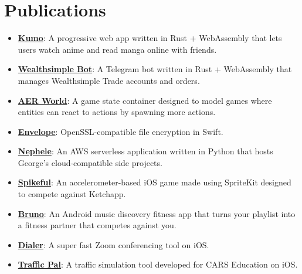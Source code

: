 \documentclass{article}
\newcommand{\resumeItem}[2]{
  \item\small{
    \textbf{#1}{: #2\vspace{-2pt}}
  }
}
\newcommand{\resumeSubItem}[2]{\resumeItem{#1}{#2}\vspace{-4pt}}
\newcommand{\resumeSubHeadingListStart}{\begin{itemize}[leftmargin=*]}
\newcommand{\resumeSubHeadingListEnd}{\end{itemize}}
\begin{document}
\section{Publications}
  \resumeSubHeadingListStart{}
    \resumeSubItem{\href{https://www.kumo.tk}{Kumo}}
      {A progressive web app written in Rust + WebAssembly that lets users watch anime and read manga online with friends.}
    \resumeSubItem{\href{https://t.me/WealthsimpleBot}{Wealthsimple Bot}}
      {A Telegram bot written in Rust + WebAssembly that manages Wealthsimple Trade accounts and orders.}
    \resumeSubItem{\href{https://github.com/george-lim/aer-world}{AER World}}
      {A game state container designed to model games where entities can react to actions by spawning more actions.}
    \resumeSubItem{\href{https://cocoapods.org/pods/envelope}{Envelope}}
      {OpenSSL-compatible file encryption in Swift.}
    \resumeSubItem{\href{https://github.com/george-lim/nephele}{Nephele}}
      {An AWS serverless application written in Python that hosts George's cloud-compatible side projects.}
    \resumeSubItem{\href{https://appadvice.com/app/spikeful/1265332106}{Spikeful}}
      {An accelerometer-based iOS game made using SpriteKit designed to compete against Ketchapp.}
    \resumeSubItem{\href{https://play.google.com/store/apps/details?id=com.bruno.android}{Bruno}}
      {An Android music discovery fitness app that turns your playlist into a fitness partner that competes against you.}
    \resumeSubItem{\href{https://appadvice.com/app/dialer/1266511331}{Dialer}}
      {A super fast Zoom conferencing tool on iOS.}
    \resumeSubItem{\href{https://appadvice.com/app/traffic-pal/1265505042}{Traffic Pal}}
      {A traffic simulation tool developed for CARS Education on iOS.}
  \resumeSubHeadingListEnd{}
\end{document}
